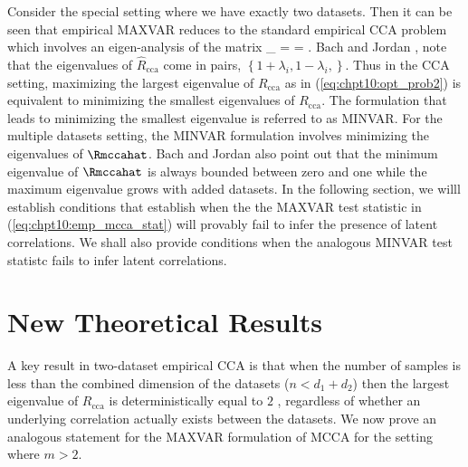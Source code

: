 Consider the special setting where we have exactly two datasets. Then it can be seen that empirical MAXVAR reduces to the standard empirical CCA
problem which involves an eigen-analysis of the matrix
\beq\label{eq:chpt10:R_cca}
_{} =
 = .
\eeq
Bach and Jordan \cite{bach2003kernel}, note that the
eigenvalues of $\widehat{R}_{\text{cca}}$ come in pairs,
$\left\{1+\lambda_i,1-\lambda_i,\right\}$. 
Thus in the CCA setting, maximizing the largest eigenvalue of
$R_{\text{cca}}$ as in (\ref{eq:chpt10:opt_prob2}) is equivalent to minimizing the smallest eigenvalues of
$R_{\text{cca}}$. The formulation that leads to minimizing the smallest eigenvalue is referred to as MINVAR. For the multiple datasets setting, the MINVAR formulation involves
minimizing the eigenvalues of $\Rmccahat$. Bach and Jordan \cite{bach2003kernel} also
point out
that the minimum eigenvalue of $\Rmccahat$ is always bounded between zero and one while
the maximum eigenvalue grows with added datasets. In the following section, we willl establish conditions that establish when the the MAXVAR test statistic  in (\ref{eq:chpt10:emp_mcca_stat}) will provably fail to infer the presence of latent correlations. We shall also provide conditions when the analogous MINVAR test statistc fails to infer latent correlations.


\section{New Theoretical Results}\label{sec:theory}

A key result in two-dataset empirical CCA is that when the number of samples is less than
the combined dimension of the datasets ($n<d_1+d_2$) then the largest eigenvalue of
$R_{\text{cca}}$ is deterministically equal to $2$ \cite{pezeshki2004empirical}, regardless of
whether an underlying correlation actually exists between the datasets. We now prove an
analogous statement for the MAXVAR formulation of MCCA for the setting where $m >2$.


